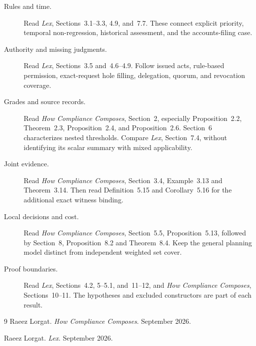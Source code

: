 \documentclass{momentum}
\begin{document}
\begin{description}
\item[Rules and time.] Read \emph{Lex}, Sections~3.1--3.3, 4.9, and~7.7. These connect explicit priority, temporal non-regression, historical assessment, and the accounts-filing case.
\item[Authority and missing judgments.] Read \emph{Lex}, Sections~3.5 and~4.6--4.9. Follow issued acts, rule-based permission, exact-request hole filling, delegation, quorum, and revocation coverage.
\item[Grades and source records.] Read \emph{How Compliance Composes}, Section~2, especially Proposition~2.2, Theorem~2.3, Proposition~2.4, and Proposition~2.6. Section~6 characterizes nested thresholds. Compare \emph{Lex}, Section~7.4, without identifying its scalar summary with mixed applicability.
\item[Joint evidence.] Read \emph{How Compliance Composes}, Section~3.4, Example~3.13 and Theorem~3.14. Then read Definition~5.15 and Corollary~5.16 for the additional exact witness binding.
\item[Local decisions and cost.] Read \emph{How Compliance Composes}, Section~5.5, Proposition~5.13, followed by Section~8, Proposition~8.2 and Theorem~8.4. Keep the general planning model distinct from independent weighted set cover.
\item[Proof boundaries.] Read \emph{Lex}, Sections~4.2, 5--5.1, and~11--12, and \emph{How Compliance Composes}, Sections~10--11. The hypotheses and excluded constructors are part of each result.
\end{description}

\begin{thebibliography}{9}
Raeez Lorgat.
\emph{How Compliance Composes}.
September 2026.

Raeez Lorgat.
\emph{Lex}.
September 2026.
\end{thebibliography}
\end{document}
